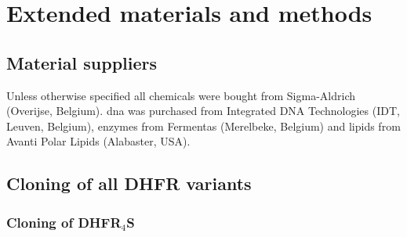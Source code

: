 \section{Extended materials and methods}
%

\subsection{Material suppliers}
%

Unless otherwise specified all chemicals were bought from Sigma-Aldrich (Overijse, Belgium). \Gls{dna} was
purchased from Integrated DNA Technologies (IDT, Leuven, Belgium), enzymes from Fermentas (Merelbeke, Belgium)
and lipids from Avanti Polar Lipids (Alabaster, USA).

\subsection{Cloning of all {DHFR} variants}
%
\label{sec:trapping_appendix:dhfr_cloning}
%

\subsubsection{Cloning of DHFR$_{4}$S}
%

